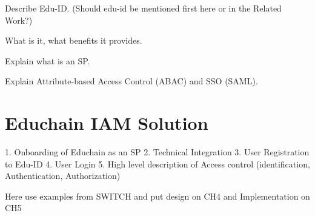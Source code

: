 Describe Edu-ID. (Should edu-id be mentioned first here or in the Related Work?)

What is it, what benefits it provides.

Explain what is an SP.

Explain Attribute-based Access Control (ABAC) and SSO (SAML).


\section{Educhain IAM Solution}

1. Onboarding of Educhain as an SP
2. Technical Integration
3. User Registration to Edu-ID
4. User Login
5. High level description of Access control (identification, Authentication, Authorization)

Here use examples from SWITCH and put design on CH4 and Implementation on CH5